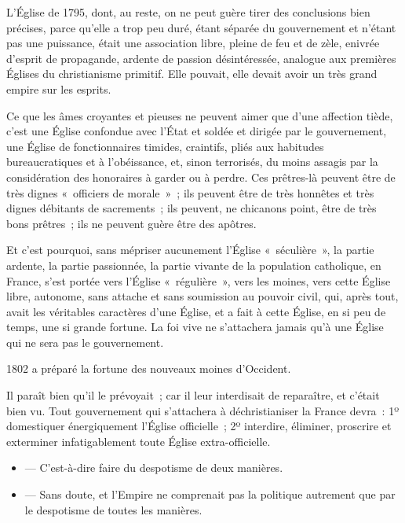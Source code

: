 \documentclass[french,twoside]{book} %
\begin{document}
L’Église de 1795, dont, au reste, on ne peut guère tirer des conclusions bien précises, parce qu’elle a trop peu duré, étant séparée du gouvernement et n’étant pas une puissance, était une association libre, pleine de feu et de zèle, enivrée d’esprit de propagande, ardente de passion désintéressée, analogue aux premières Églises du christianisme primitif. Elle pouvait, elle devait avoir un très grand empire sur les esprits.\par
 Ce que les âmes croyantes et pieuses ne peuvent aimer que d’une affection tiède, c’est une Église confondue avec l’État et soldée et dirigée par le gouvernement, une Église de fonctionnaires timides, craintifs, pliés aux habitudes bureaucratiques et à l’obéissance, et, sinon terrorisés, du moins assagis par la considération des honoraires à garder ou à perdre. Ces prêtres-là peuvent être de très dignes « officiers de morale » ; ils peuvent être de très honnêtes et très dignes débitants de sacrements ; ils peuvent, ne chicanons point, être de très bons prêtres ; ils ne peuvent guère être des apôtres.\par
Et c’est pourquoi, sans mépriser aucunement l’Église « séculière », la partie ardente, la partie passionnée, la partie vivante de la population catholique, en France, s’est portée vers l’Église « régulière », vers les moines, vers cette Église libre, autonome, sans attache et sans soumission au pouvoir civil, qui, après tout, avait les véritables caractères d’une Église, et a fait à cette Église, en si peu de temps, une si grande fortune. La foi vive ne s’attachera jamais qu’à une Église qui ne sera pas le gouvernement.\par
1802 a préparé la fortune des nouveaux moines d’Occident.\par
Il paraît bien qu’il le prévoyait ; car il leur interdisait  de reparaître, et c’était bien vu. Tout gouvernement qui s’attachera à déchristianiser la France devra : 1º domestiquer énergiquement l’Église officielle ; 2º interdire, éliminer, proscrire et exterminer infatigablement toute Église extra-officielle.\par

\begin{itemize}[itemsep=0pt,]
\item  — C’est-à-dire faire du despotisme de deux manières.
\item  — Sans doute, et l’Empire ne comprenait pas la politique autrement que par le despotisme de toutes les manières.
\end{itemize}
\end{document}
